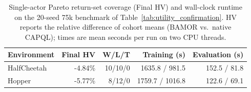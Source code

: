 \begin{table}[!htbp]
\centering\small\setlength{\tabcolsep}{4.5pt}
\caption{Single-actor Pareto return-set coverage (Final HV) and wall-clock runtime on the 20-seed 75k benchmark of Table~\ref{tab:utility_confirmation}. HV reports the relative difference of cohort means (BAMOR vs.\ native CAPQL); times are mean seconds per run on two CPU threads.}
\label{tab:utility_secondary}
\begin{tabular}{@{}lrrrr@{}}
\toprule
Environment & Final HV & W/L/T & Training (s) & Evaluation (s) \\
\midrule
HalfCheetah & -4.84\% & 10/10/0 & 1635.8 / 981.5 & 152.5 / 81.8 \\
Hopper & -5.77\% & 8/12/0 & 1759.7 / 1016.8 & 122.6 / 69.1 \\
\bottomrule
\end{tabular}
\end{table}
